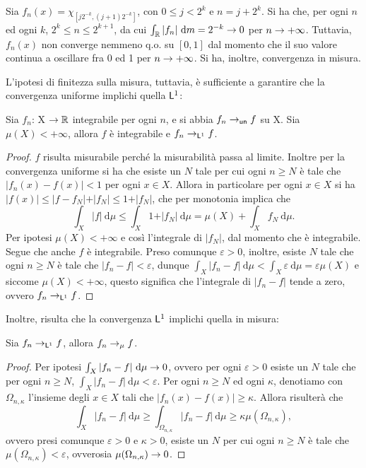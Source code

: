 \documentclass[Completo.tex]{subfiles}
\begin{document}
\begin{Ex}
	Sia $f_n(x) = \chi_{[j2^{-k}, (j+1)2^{-k}]}$, con $0 \leq j < 2^k$ e $n = j + 2^k$. Si ha che, per ogni $n$ ed ogni $k$, $2^k \leq n \leq 2^{k+1}$, da cui $\int_{\bb[R]} \vert f_n \vert \ \mathrm{d}m = 2^{-k} \ra 0$ per $n \rightarrow +\infty$. Tuttavia, $f_n(x)$ non converge nemmeno q.o. su $[0,1]$ dal momento che il suo valore continua a oscillare fra 0 ed 1 per $n \rightarrow +\infty$. Si ha, inoltre, convergenza in misura.
\end{Ex}
L'ipotesi di finitezza sulla misura, tuttavia, è sufficiente a garantire che la convergenza uniforme implichi quella $\sf[L]^1$:
\begin{Th}
	Sia $f_n$: X $\ra \bb[R]$ integrabile per ogni $n$, e si abbia $f_n \ra_{\sf[un]} f$ su X. Sia $\mu(X) < +\infty$, allora $f$ è integrabile e $f_n \ra_{\sf[L]^1} f$.
\end{Th}
\begin{proof}
	$f$ risulta misurabile perché la misurabilità passa al limite. Inoltre per la convergenza uniforme si ha che esiste un $N$ tale per cui ogni $n \geq N$ è tale che $\vert f_n(x) - f(x) \vert < 1$ per ogni $x \in X$. Allora in particolare per ogni $x \in X$ si ha $\vert f(x) \vert \leq \vert f - f_N \vert + \vert f_N \vert \leq 1 + \vert f_N \vert$, che per monotonia implica che
	\begin{equation*}
	\int_X \vert f \vert \ \mathrm{d}\mu \leq \int_X 1 + \vert f_N \vert \ \mathrm{d}\mu = \mu(X) + \int_X f_N \ \mathrm{d}\mu.
	\end{equation*}
	Per ipotesi $\mu(X) < +\infty$ e così l'integrale di $\vert f_N \vert$, dal momento che è integrabile. Segue che anche $f$ è integrabile. Preso comunque $\varepsilon > 0$, inoltre, esiste $N$ tale che ogni $n \geq N$ è tale che $\vert f_n - f\vert < \varepsilon$, dunque $\int_X \vert f_n - f \vert \ \mathrm{d}\mu < \int_X \varepsilon \ \mathrm{d}\mu = \varepsilon \mu(X)$ e siccome $\mu(X) < +\infty$, questo significa che l'integrale di $\vert f_n - f \vert$ tende a zero, ovvero $f_n \ra_{\sf[L]^1} f$.
	\end{proof}
Inoltre, risulta che la convergenza $\sf[L]^1$ implichi quella in misura:
\begin{eTh}
	Sia $f_n \ra_{\sf[L]^1} f$, allora $f_n \rightarrow_{\mu} f$.
\end{eTh}
\begin{proof}
	Per ipotesi $\int_X \vert f_n - f \vert \ \mathrm{d}\mu \rightarrow 0$, ovvero per ogni $\varepsilon > 0$ esiste un $N$ tale che per ogni $n \geq N$, $\int_X \vert f_n - f \vert \ \mathrm{d}\mu < \varepsilon$. Per ogni $n \geq N$ ed ogni $\kappa$, denotiamo con $\Omega_{n, \kappa}$ l'insieme degli $x \in X$ tali che $\vert f_n(x) - f(x) \vert \geq \kappa$. Allora risulterà che 
	\begin{equation*}
	\int_X \vert f_n - f \vert \ \mathrm{d}\mu \geq \int_{\Omega_{n, \kappa}} \vert f_n - f \vert \ \mathrm{d}\mu \geq \kappa \mu(\Omega_{n, \kappa}),
	\end{equation*}
	 ovvero presi comunque $\varepsilon > 0$ e $\kappa > 0$, esiste un $N$ per cui ogni $n \geq N$ è tale che $\mu(\Omega_{n, \kappa}) < \varepsilon$, ovverosia $\mu(\Omega_{n, \kappa}) \rightarrow 0$.
\end{proof}
\end{document}
